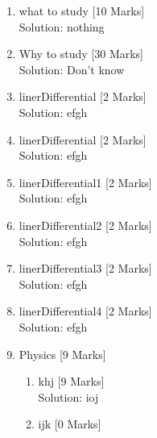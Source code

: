 \documentclass[10pt]{article}
\begin{document}
\pagebreak\begin{enumerate}\item what to study\hfill
[10 Marks]
\\Solution: nothing\\\vspace*{10pt}\item Why to study\hfill
[30 Marks]
\\Solution: Don't know\\\vspace*{10pt}\item linerDifferential\hfill
[2 Marks]
\\Solution: efgh\\\vspace*{10pt}\item linerDifferential\hfill
[2 Marks]
\\Solution: efgh\\\vspace*{10pt}\item linerDifferential1\hfill
[2 Marks]
\\Solution: efgh\\\vspace*{10pt}\item linerDifferential2\hfill
[2 Marks]
\\Solution: efgh\\\vspace*{10pt}\item linerDifferential3\hfill
[2 Marks]
\\Solution: efgh\\\vspace*{10pt}\item linerDifferential4\hfill
[2 Marks]
\\Solution: efgh\\\vspace*{10pt}\item Physics\hfill
[9 Marks]
\begin{enumerate}\item khj\hfill
[9 Marks]
\\Solution: ioj\\\vspace*{10pt}\item ijk\hfill
[0 Marks]
\end{enumerate}
\end{enumerate}
\end{document}
